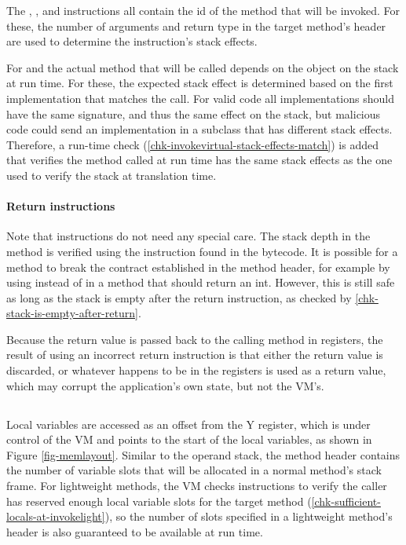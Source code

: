 The , , and  instructions all contain the id of the method that will be invoked. For these, the number of arguments and return type in the target method's header are used to determine the instruction's stack effects.
 
For  and  the actual method that will be called depends on the object on the stack at run time. For these, the expected stack effect is determined based on the first implementation that matches the call. For valid code all implementations should have the same signature, and thus the same effect on the stack, but malicious code could send an implementation in a subclass that has different stack effects. Therefore, a run-time check (\ref{chk-invokevirtual-stack-effects-match}) is added that verifies the method called at run time has the same stack effects as the one used to verify the stack at translation time.

\paragraph{Return instructions}
Note that  instructions do not need any special care. The stack depth in the method is verified using the instruction found in the bytecode. It is possible for a method to break the contract established in the method header, for example by using  instead of  in a method that should return an int. However, this is still safe as long as the stack is empty after the return instruction, as checked by \ref{chk-stack-is-empty-after-return}.

Because the return value is passed back to the calling method in registers, the result of using an incorrect return instruction is that either the return value is discarded, or whatever happens to be in the registers is used as a return value, which may corrupt the application's own state, but not the VM's.

\subsection{}
Local variables are accessed as an offset from the Y register, which is under control of the VM and points to the start of the local variables, as shown in Figure \ref{fig-memlayout}. Similar to the operand stack, the method header contains the number of variable slots that will be allocated in a normal method's stack frame. For lightweight methods, the VM checks  instructions to verify the caller has reserved enough local variable slots for the target method (\ref{chk-sufficient-locals-at-invokelight}), so the number of slots specified in a lightweight method's header is also guaranteed to be available at run time.

